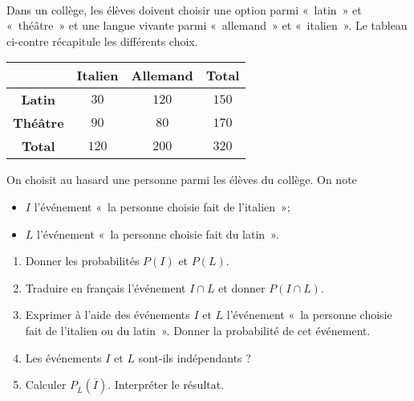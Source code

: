 \documentclass[11pt]{article}
\begin{document}
\vspace{2cm}
\setcounter{exo}{0}
\begin{exo}[$6$ points]~\\
\begin{minipage}{.55\textwidth}
Dans un collège, les élèves doivent choisir une option parmi «~latin~»
et «~thé\^atre~» et une langue vivante parmi «~allemand~» et «~italien~». Le
tableau ci-contre récapitule les différents choix.
\end{minipage}
\begin{minipage}{.45\textwidth}
  \begin{center}
 \begin{tabular}{cccc}
  \toprule
  & \textbf{Italien} & \textbf{Allemand} & \textbf{Total} \\
  \midrule
  \textbf{Latin} & $30$ & $120$ & $150$ \\
  \textbf{Thé\^atre} & $90$ & $80$ & $170$ \\
  \textbf{Total} & $120$ & $200$ & $320$ \\
  \bottomrule
\end{tabular}
  \end{center}
\end{minipage}
On choisit au hasard une personne parmi les élèves du collège. On note
\begin{itemize}
  \item $I$ l'événement «~la personne choisie fait de l'italien~»;
  \item $L$ l'événement «~la personne choisie fait du latin~».
\end{itemize}
\begin{enumerate}
  \item Donner les probabilités $P(I)$ et $P(L)$.
  \item Traduire en français l'événement $I\cap L$ et donner $P(I\cap L)$.
  \item Exprimer à l'aide des événements $I$ et $L$ l'événement «~la personne
    choisie fait de l'italien ou du latin~». Donner la probabilité de cet
    événement.
  \item Les événements $I$ et $L$ sont-ils indépendants ?
  \item Calculer $P_{\overline L}(\overline I)$. Interpréter le résultat.
\end{enumerate}
\end{exo}
\end{document}
